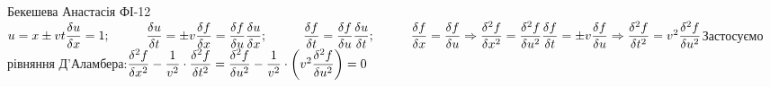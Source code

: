 \documentclass[a4paper,12pt]{article}
\newcommand\tab[1][1cm]{\hspace*{#1}}
\begin{document}
	 Бекешева Анастасія ФІ-12\\
	 $u=x\pm vt\\\\\dfrac{\delta u}{\delta x}=1;\tab \dfrac{\delta u}{\delta t}=\pm v\\\dfrac{\delta f}{\delta x}=\dfrac{\delta f}{\delta u}\dfrac{\delta u}{\delta x};\tab \dfrac{\delta f}{\delta t}=\dfrac{\delta f}{\delta u}\dfrac{\delta u}{\delta t};\tab \dfrac{\delta f}{\delta x}=\dfrac{\delta f}{\delta u}\Rightarrow\dfrac{\delta^2 f}{\delta x^2}=\dfrac{\delta^2 f}{\delta u^2}\\\dfrac{\delta f}{\delta t}=\pm v\dfrac{\delta f}{\delta u}\Rightarrow\dfrac{\delta^2 f}{\delta t^2}=v^2\dfrac{\delta^2 f}{\delta u^2}\\\\$Застосуємо рівняння Д'Аламбера:$\\\dfrac{\delta^2 f}{\delta x^2}-\dfrac1{v^2}\cdot\dfrac{\delta^2 f}{\delta t^2}=\dfrac{\delta^2 f}{\delta u^2}-\dfrac1{v^2}\cdot\left(v^2\dfrac{\delta^2 f}{\delta u^2}\right)=0$
	 	
\end{document}
